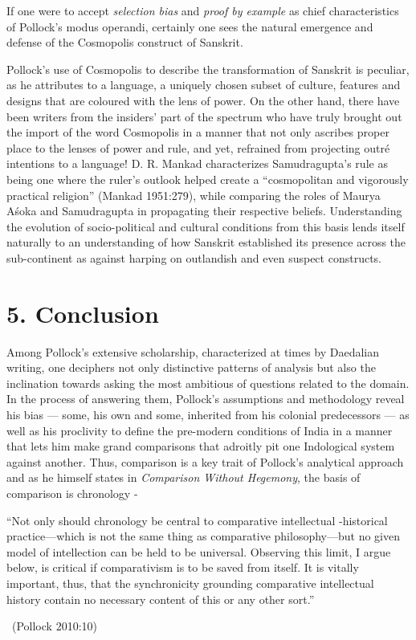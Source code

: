 If one were to accept \textit{selection bias} and \textit{proof by example} as chief characteristics of Pollock’s modus operandi, certainly one sees the natural emergence and defense of the Cosmopolis construct of Sanskrit.

Pollock’s use of Cosmopolis to describe the transformation of Sanskrit is peculiar, as he attributes to a language, a uniquely chosen subset of culture, features and designs that are coloured with the lens of power. On the other hand, there have been writers from the insiders’ part of the spectrum who have truly brought out the import of the word Cosmopolis in a manner that not only ascribes proper place to the lenses of power and rule, and yet, refrained from projecting outré intentions to a language! D. R. Mankad characterizes Samudragupta’s rule as being one where the ruler’s outlook helped create a “cosmopolitan and vigorously practical religion” (Mankad 1951:279), while comparing the roles of Maurya Aśoka and Samudragupta in propagating their respective beliefs. Understanding the evolution of socio-political and cultural conditions from this basis lends itself naturally to an understanding of how Sanskrit established its presence across the sub-continent as against harping on outlandish and even suspect constructs.


\vspace{-.3cm}

\section*{5. Conclusion}

Among Pollock’s extensive scholarship, characterized at times by Daedalian writing, one deciphers not only distinctive patterns of analysis but also the inclination towards asking the most ambitious of questions related to the domain. In the process of answering them, Pollock’s assumptions and methodology reveal his bias — some, his own and some, inherited from his colonial predecessors — as well as his proclivity to define the pre-modern conditions of India in a manner that lets him make grand comparisons that adroitly pit one Indological system against another. Thus, comparison is a key trait of Pollock’s analytical approach and as he himself states in \textit{Comparison Without Hegemony}, the basis of comparison is chronology -

\begin{myquote}
“Not only should chronology be central to comparative intellectual -historical practice—which is not the same thing as comparative philosophy—but no given model of intellection can be held to be universal. Observing this limit, I argue below, is critical if comparativism is to be saved from itself. It is vitally important, thus, that the synchronicity grounding comparative intellectual history contain no necessary content of this or any other sort.” 

~\hfill (Pollock 2010:10)
\end{myquote}

